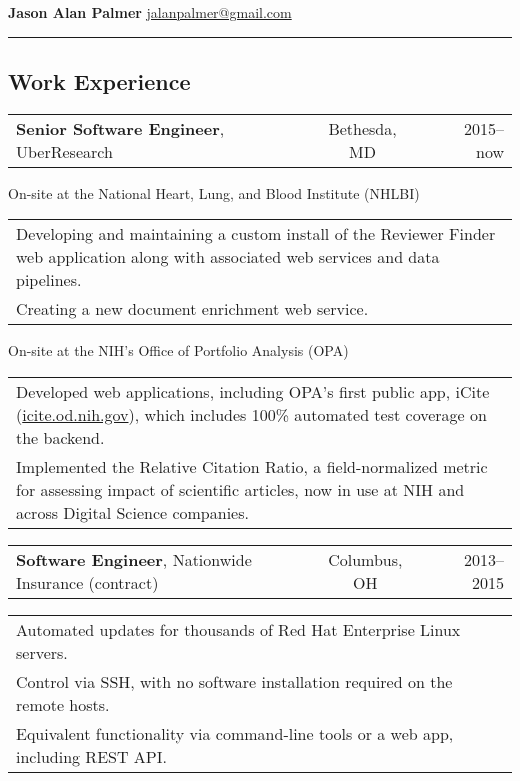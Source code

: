 \documentclass[12pt]{report}
\renewcommand{\bullet}{$\vcenter{\hbox{~\huge$\cdot$~}}$}
\begin{document}
\textbf{\large Jason Alan Palmer} \hfill \href{mailto:jalanpalmer@gmail.com}{jalanpalmer@gmail.com}

\rule{\textwidth}{1pt}

\subsection*{Work Experience}

\begin{tabularx}{\textwidth}{ @{} l X c X r @{} }
\textbf{Senior Software Engineer}, UberResearch && Bethesda, MD && 2015--now \\
\end{tabularx}
On-site at the National Heart, Lung, and Blood Institute (NHLBI) \\
\begin{tabularx}{\textwidth}{ @{\bullet} X @{} }
Developing and maintaining a custom install of the Reviewer Finder web application along with associated web services and data pipelines. \\
Creating a new document enrichment web service. \\
\end{tabularx}
On-site at the NIH's Office of Portfolio Analysis (OPA) \\
\begin{tabularx}{\textwidth}{ @{\bullet} X @{} }
Developed web applications, including OPA's first public app, iCite (\href{https://icite.od.nih.gov}{icite.od.nih.gov}), which includes 100\% automated test coverage on the backend. \\
Implemented the Relative Citation Ratio, a field-normalized metric for assessing impact of scientific articles, now in use at NIH and across Digital Science companies. \\
\end{tabularx}

\begin{tabularx}{\textwidth}{ @{} l X c X r @{} }
\textbf{Software Engineer}, Nationwide Insurance (contract) && Columbus, OH && 2013--2015 \\
\end{tabularx}
\begin{tabularx}{\textwidth}{ @{\bullet} X @{} }
Automated updates for thousands of Red Hat Enterprise Linux servers. \\
Control via SSH, with no software installation required on the remote hosts. \\
Equivalent functionality via command-line tools or a web app, including REST API. \\
\end{tabularx}
\end{document}
